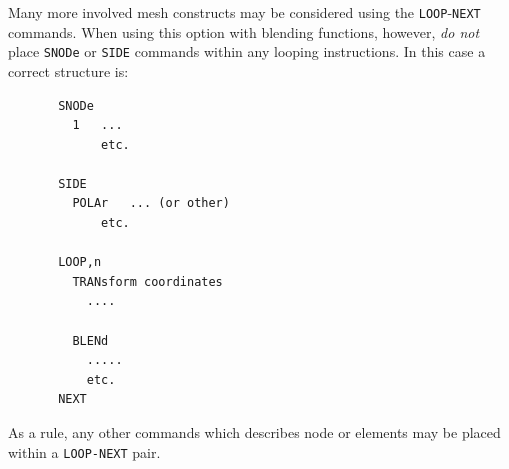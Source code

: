 Many more involved mesh constructs may be considered using the
\texttt{LOOP}-\texttt{NEXT} commands.  When using this option with blending
functions, however, \textit{do not} place \texttt{SNODe} or \texttt{SIDE}
commands within any looping instructions.  In this case a correct
structure is:
\begin{verbatim}
       SNODe
         1   ...
             etc.

       SIDE
         POLAr   ... (or other)
             etc.

       LOOP,n
         TRANsform coordinates
           ....

         BLENd
           .....
           etc.
       NEXT
\end{verbatim}
As a rule, any other commands which describes node or elements may
be placed within a \texttt{LOOP-NEXT} pair.

